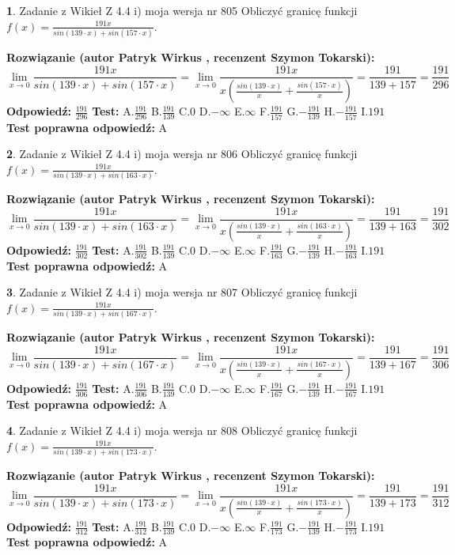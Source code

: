 \documentclass[12pt, a4paper]{article}
\theoremstyle{definition} %
\newtheorem{zad}{}
\newcommand{\zadStart}[1]{\begin{zad}#1\newline}
\newcommand{\zadStop}{\end{zad}}
\newcommand{\rozwStart}[2]{\noindent \textbf{Rozwiązanie (autor #1 , recenzent #2): }\newline}
\newcommand{\rozwStop}{\newline}
\newcommand{\odpStart}{\noindent \textbf{Odpowiedź:}\newline}
\newcommand{\odpStop}{\newline}
\newcommand{\testStart}{\noindent \textbf{Test:}\newline}
\newcommand{\testStop}{\newline}
\newcommand{\kluczStart}{\noindent \textbf{Test poprawna odpowiedź:}\newline}
\newcommand{\kluczStop}{\newline}
\begin{document}
\zadStart{Zadanie z Wikieł Z 4.4 i) moja wersja nr 805}
Obliczyć granicę funkcji $f(x)=\frac{191x}{sin(139\cdot x) +sin(157\cdot x)}$.
\zadStop
\rozwStart{Patryk Wirkus}{Szymon Tokarski}
$$\lim\limits_{x\to 0}\frac{191x}{sin(139\cdot x) +sin(157\cdot x)}=\lim\limits_{x\to 0}\frac{191x}{x(\frac{sin(139\cdot x)}{x}+\frac{sin(157\cdot x)}{x})}=\frac{191}{139+157} = \frac{191}{296}$$
\rozwStop
\odpStart
$\frac{191}{296}$
\odpStop
\testStart
A.$\frac{191}{296}$
B.$\frac{191}{139}$
C.$0$
D.$-\infty$
E.$\infty$
F.$\frac{191}{157}$
G.$-\frac{191}{139}$
H.$-\frac{191}{157}$
I.$191$
\testStop
\kluczStart
A
\kluczStop



\zadStart{Zadanie z Wikieł Z 4.4 i) moja wersja nr 806}
Obliczyć granicę funkcji $f(x)=\frac{191x}{sin(139\cdot x) +sin(163\cdot x)}$.
\zadStop
\rozwStart{Patryk Wirkus}{Szymon Tokarski}
$$\lim\limits_{x\to 0}\frac{191x}{sin(139\cdot x) +sin(163\cdot x)}=\lim\limits_{x\to 0}\frac{191x}{x(\frac{sin(139\cdot x)}{x}+\frac{sin(163\cdot x)}{x})}=\frac{191}{139+163} = \frac{191}{302}$$
\rozwStop
\odpStart
$\frac{191}{302}$
\odpStop
\testStart
A.$\frac{191}{302}$
B.$\frac{191}{139}$
C.$0$
D.$-\infty$
E.$\infty$
F.$\frac{191}{163}$
G.$-\frac{191}{139}$
H.$-\frac{191}{163}$
I.$191$
\testStop
\kluczStart
A
\kluczStop



\zadStart{Zadanie z Wikieł Z 4.4 i) moja wersja nr 807}
Obliczyć granicę funkcji $f(x)=\frac{191x}{sin(139\cdot x) +sin(167\cdot x)}$.
\zadStop
\rozwStart{Patryk Wirkus}{Szymon Tokarski}
$$\lim\limits_{x\to 0}\frac{191x}{sin(139\cdot x) +sin(167\cdot x)}=\lim\limits_{x\to 0}\frac{191x}{x(\frac{sin(139\cdot x)}{x}+\frac{sin(167\cdot x)}{x})}=\frac{191}{139+167} = \frac{191}{306}$$
\rozwStop
\odpStart
$\frac{191}{306}$
\odpStop
\testStart
A.$\frac{191}{306}$
B.$\frac{191}{139}$
C.$0$
D.$-\infty$
E.$\infty$
F.$\frac{191}{167}$
G.$-\frac{191}{139}$
H.$-\frac{191}{167}$
I.$191$
\testStop
\kluczStart
A
\kluczStop



\zadStart{Zadanie z Wikieł Z 4.4 i) moja wersja nr 808}
Obliczyć granicę funkcji $f(x)=\frac{191x}{sin(139\cdot x) +sin(173\cdot x)}$.
\zadStop
\rozwStart{Patryk Wirkus}{Szymon Tokarski}
$$\lim\limits_{x\to 0}\frac{191x}{sin(139\cdot x) +sin(173\cdot x)}=\lim\limits_{x\to 0}\frac{191x}{x(\frac{sin(139\cdot x)}{x}+\frac{sin(173\cdot x)}{x})}=\frac{191}{139+173} = \frac{191}{312}$$
\rozwStop
\odpStart
$\frac{191}{312}$
\odpStop
\testStart
A.$\frac{191}{312}$
B.$\frac{191}{139}$
C.$0$
D.$-\infty$
E.$\infty$
F.$\frac{191}{173}$
G.$-\frac{191}{139}$
H.$-\frac{191}{173}$
I.$191$
\testStop
\kluczStart
A
\kluczStop
\end{document}
